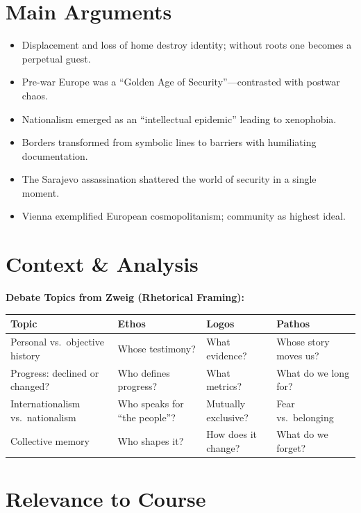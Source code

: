 \documentclass[11pt,a4paper]{article}
\begin{document}
\section*{Main Arguments}

\begin{itemize}
\item Displacement and loss of home destroy identity; without roots one becomes a perpetual guest.
\item Pre-war Europe was a ``Golden Age of Security''---contrasted with postwar chaos.
\item Nationalism emerged as an ``intellectual epidemic'' leading to xenophobia.
\item Borders transformed from symbolic lines to barriers with humiliating documentation.
\item The Sarajevo assassination shattered the world of security in a single moment.
\item Vienna exemplified European cosmopolitanism; community as highest ideal.
\end{itemize}

\section*{Context \& Analysis}

\textbf{Debate Topics from Zweig (Rhetorical Framing):}

\begin{table}[h]
\centering
\footnotesize
\begin{tabular}{@{}llll@{}}
\toprule
\textbf{Topic} & \textbf{Ethos} & \textbf{Logos} & \textbf{Pathos} \\
\midrule
Personal vs.\ objective history & Whose testimony? & What evidence? & Whose story moves us? \\
Progress: declined or changed? & Who defines progress? & What metrics? & What do we long for? \\
Internationalism vs.\ nationalism & Who speaks for ``the people''? & Mutually exclusive? & Fear vs.\ belonging \\
Collective memory & Who shapes it? & How does it change? & What do we forget? \\
\bottomrule
\end{tabular}
\end{table}

\section*{Relevance to Course}
\end{document}
